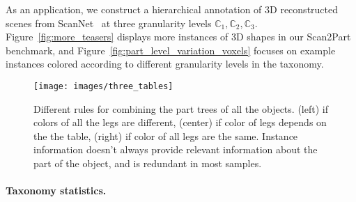 As an application, we construct a hierarchical annotation of 3D reconstructed scenes from ScanNet~\cite{dai2017scannet} at three granularity levels $\mathbb{C}_1, \mathbb{C}_2, \mathbb{C}_3$. Figure~\ref{fig:more_teasers} displays more instances of 3D shapes in our Scan2Part benchmark, and Figure~\ref{fig:part_level_variation_voxels} focuses on example instances colored according to different granularity levels in the taxonomy.







\begin{figure}[!t]
\label{fig:three_tables}
\centering
\texttt{[image: images/three\_tables]}
\caption{Different rules for combining the part trees of all the objects. (left) if colors of all the legs are different, (center) if color of legs depends on the the table, (right) if color of all legs are the same. Instance information doesn't always provide relevant information about the part of the object, and is redundant in most samples.}
\end{figure}







\paragraph{Taxonomy statistics. }
\label{dataset:taxonomy-stats}




